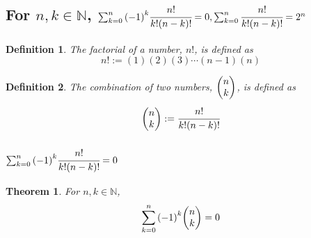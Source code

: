 \documentclass[]{article}
\newcommand{\N}{\mathbb{N}}
\newtheorem{definition}{Definition}
\newtheorem{theorem}{Theorem}
\begin{document}
\newpage
\subsection{For $n,k \in \N$,
    $\sum_{k=0}^{n} \qty(-1)^k \cfrac{n!}{k!(n-k)!} = 0, 
    \sum_{k=0}^{n} \cfrac{n!}{k!(n-k)!} = 2^n$
}
\begin{definition}
    The factorial of a number, $n!$, is defined as
    $$n! := (1)(2)(3)\cdots(n-1)(n)$$
\end{definition}
\begin{definition}
    The combination of two numbers, $\mqty(n\\k)$, is defined as
    $$\mqty(n\\k) := \cfrac{n!}{k!(n-k)!}$$
\end{definition}
\subsubsection{$\sum_{k=0}^{n} \qty(-1)^k \cfrac{n!}{k!(n-k)!} = 0$}
\begin{theorem}
    For $n,k \in \N$,
    $$\sum_{k=0}^{n} \qty(-1)^k \mqty(n\\k) = 0$$
\end{theorem}
\end{document}
